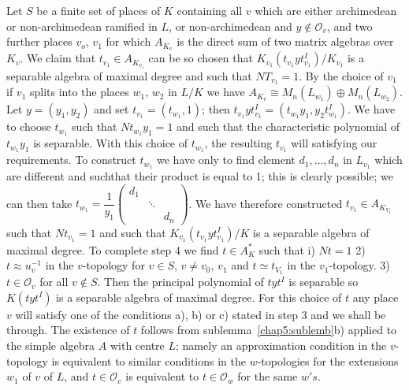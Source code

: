 \setcounter{proofofstep}{3}
\begin{proofofstep} %
 Let $S$ be a finite set of places of $K$ containing all $v$ which are
 either archimedean or non-archimedean ramified in $L$, or
 non-archimedean and $y \notin \mathscr{O}_v$, and two
 further places $v_o$, $v_1$ for which $A_{K_v}$ is the direct sum of two
 matrix algebras over $K_v$. We claim that $t_{v_1} \in A_{K_{v_1}}$ can be
 so chosen that $K_{v_1}(t_{v_1} yt^I_{v_1})/K_{v_1}$ is a separable
 algebra of maximal degree and such that $NT_{v_1}=1$. By the choice
 of $v_1$ if $v_1$ splits into the places $w_1$, $w_2$ in $L/K$ we have
 $A_{K_v} \cong M_n (L_{w_1}) \oplus M_n (L_{w_2})$. Let $y=(y_1,y_2)$
 and set $t_{v_1}=(t_{w_1},1)$; then $t_{v_1}yt^I_{v_1}=
 (t_{w_1}y_1,y_2 t_{w_1}^I)$. We have to choose $t_{w_1}$ such
 that $Nt_{w_1}y_1=1$ and such that the characteristic  polynomial of
 $t_{w_1}y_1$ is separable. With this choice of $t_{w_1}$, the
 resulting $t_{v_1}$ will satisfying our requirements. To construct
 $t_{w_1}$ we have only to find element $d_1, \ldots ,d_n$ in
 $L_{v_1}$ which are different and such\pageoriginale that their
 product is equal to 1; this is clearly possible; we can then take
 $t_{w_1} = \dfrac{1}{y_1} 
\begin{pmatrix}
d_1 & &\\ 
& \ddots &  \\
&& d_n 
 \end{pmatrix}$. 
We have therefore constructed $t_{v_1} \in
 A_{K_{V_1}}$ such that $Nt_{v_1} = 1$ and such that
 $K_{v_1}(t_{v_1} yt^I_{v_1})/K$ is a separable algebra of maximal
 degree. To complete step 4 we find $t \in A_K^*$ such that i) $Nt=1$
 2) $t \approx u_v^{-1}$ in the $v$-topology for $v \in S$, $v \neq
 v_0$, $v_1$ and $t \simeq t_{V_1}$ in the $v_1$-topology. 3) $t \in
 \mathscr{O}_v$ for all $v \notin S$. Then the principal polynomial of
 $tyt^{I}$ is separable so $K(tyt^I)$ is a separable algebra of
 maximal degree. For this choice of $t$ any place $v$ will satisfy one
 of the conditions a), b) or c) stated in step 3 and we shall
 be through. The existence of $t$ follows from sublemma~\ref{chap5:sublemb}b) applied
 to the simple algebra $A$ with centre $L$; namely an approximation
 condition in the $v$-topology is equivalent to similar conditions in
 the $w$-topologies for the extensions $w_1$ of $v$ of $L$, and $t \in
 \mathscr{O}_v$ is equivalent to $t \in \mathscr{O}_w$ for the same $w's$. 
\end{proofofstep}

